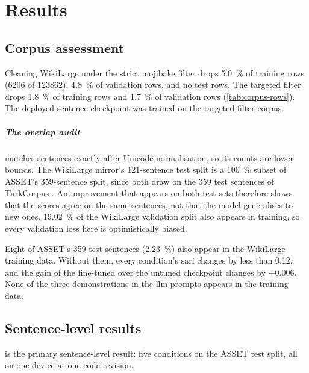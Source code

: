\chapter{Results}
\label{sec:results}

\section{Corpus assessment}
\label{sec:corpus-results}

Cleaning WikiLarge under the strict mojibake filter drops \qty{5.0}{\percent} of training rows (\num{6206} of \num{123862}), \qty{4.8}{\percent} of validation rows, and no test rows.
The targeted filter drops \qty{1.8}{\percent} of training rows and \qty{1.7}{\percent} of validation rows (\cref{tab:corpus-rows}).
The deployed sentence checkpoint was trained on the targeted-filter corpus.

\paragraph{The overlap audit} matches sentences exactly after Unicode normalisation, so its counts are lower bounds.
The WikiLarge mirror's \num{121}-sentence test split is a \qty{100}{\percent} subset of ASSET's \num{359}-sentence split, since both draw on the \num{359} test sentences of TurkCorpus \parencites[588--589]{zhang-lapata-2017-sentence}[4671]{alva-manchego-etal-2020-asset}.
An improvement that appears on both test sets therefore shows that the scores agree on the same sentences, not that the model generalises to new ones.
\qty{19.02}{\percent} of the WikiLarge validation split also appears in training, so every validation loss here is optimistically biased.

Eight of ASSET's \num{359} test sentences (\qty{2.23}{\percent}) also appear in the WikiLarge training data.
Without them, every condition's \gls{sari} changes by less than \num{0.12}, and the gain of the fine-tuned over the untuned checkpoint changes by \(+0.006\).
None of the three demonstrations in the \gls{llm} prompts appears in the training data.

\section{Sentence-level results}
\label{sec:sentence-results}

 is the primary sentence-level result: five conditions on the ASSET test split, all on one device at one code revision.

